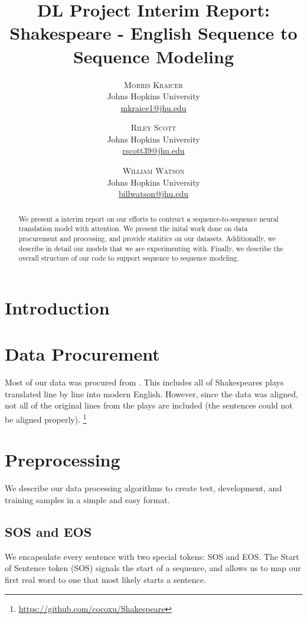 \documentclass[twoside,twocolumn]{article}
\title{DL Project Interim Report:\\
       Shakespeare - English Sequence to Sequence Modeling}
\author{%
\textsc{Morris Kraicer} \\[1ex]
\normalsize Johns Hopkins University \\
\normalsize \href{mailto:mkraice1@jhu.edu}{mkraice1@jhu.edu}
 \and
 \textsc{Riley Scott} \\[1ex]
\normalsize Johns Hopkins University \\
\normalsize \href{mailto:rscott39@jhu.edu}{rscott39@jhu.edu}
 \and
  \textsc{William Watson} \\[1ex]
\normalsize Johns Hopkins University \\
\normalsize \href{mailto:billwatson@jhu.edu}{billwatson@jhu.edu}
}
\date{}%
\begin{document}
\maketitle



\begin{abstract}
\noindent
We present a interim report on our efforts to contruct a sequence-to-sequence
neural translation model with attention. We present the inital work done on
data procurement and processing, and provide statitics on our datasets.
Additionally, we describe in detail our models that we are experimenting with.
Finally, we describe the overall structure of our code to support sequence
to sequence modeling.
\end{abstract}


\section{Introduction}



\section{Data Procurement}
Most of our data was procured from \cite{xu2012paraphrasing}.
This includes all of Shakespeares plays translated line by line into modern
English. However, since the data was aligned, not all of the original lines
from the plays are included (the sentences could not be aligned properly).
\footnote{\url{https://github.com/cocoxu/Shakespeare}}


\section{Preprocessing}
We describe our data processing algorithms to create test, development,
and training samples in a simple and easy format.
\subsection{SOS and EOS}
We encapsulate every sentence with two special tokens: SOS and EOS.
The Start of Sentence token (SOS) signals the start of a sequence, and allows
us to map our first real word to one that most likely starts a sentence.
\end{document}
